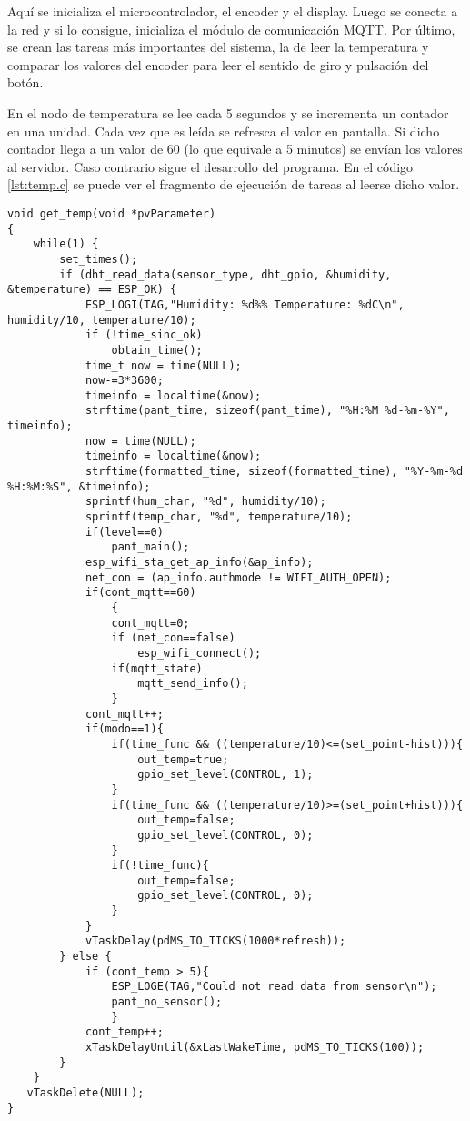Aquí se inicializa el microcontrolador, el encoder y el display. Luego se conecta a la red y si lo consigue, inicializa el módulo de comunicación MQTT. Por último, se crean las tareas más importantes del sistema, la de leer la temperatura y comparar los valores del encoder para leer el sentido de giro y pulsación del botón.

En el nodo de temperatura se lee cada 5 segundos y se incrementa un contador en una unidad. Cada vez que es leída se refresca el valor en pantalla. Si dicho contador llega a un valor de 60 (lo que equivale a 5 minutos) se envían los valores al servidor. Caso contrario sigue el desarrollo del programa. En el código \ref{lst:temp.c} se puede ver el fragmento de ejecución de tareas al leerse dicho valor.

\begin{lstlisting}[caption={Código de lectura de temperatura}, label={lst:temp.c}]
void get_temp(void *pvParameter)
{
    while(1) {
        set_times();
        if (dht_read_data(sensor_type, dht_gpio, &humidity, &temperature) == ESP_OK) {
            ESP_LOGI(TAG,"Humidity: %d%% Temperature: %dC\n", humidity/10, temperature/10);
            if (!time_sinc_ok)
                obtain_time();
            time_t now = time(NULL);
            now-=3*3600;
            timeinfo = localtime(&now);
            strftime(pant_time, sizeof(pant_time), "%H:%M %d-%m-%Y", timeinfo);
            now = time(NULL);
            timeinfo = localtime(&now);
            strftime(formatted_time, sizeof(formatted_time), "%Y-%m-%d %H:%M:%S", &timeinfo);
            sprintf(hum_char, "%d", humidity/10);
			sprintf(temp_char, "%d", temperature/10);
            if(level==0)
                pant_main();
            esp_wifi_sta_get_ap_info(&ap_info);
            net_con = (ap_info.authmode != WIFI_AUTH_OPEN);
            if(cont_mqtt==60)
                {
                cont_mqtt=0;
                if (net_con==false)
                    esp_wifi_connect();
                if(mqtt_state)    
                    mqtt_send_info();
                }
            cont_mqtt++;
            if(modo==1){
                if(time_func && ((temperature/10)<=(set_point-hist))){
                    out_temp=true;
                    gpio_set_level(CONTROL, 1);
                }
                if(time_func && ((temperature/10)>=(set_point+hist))){
                    out_temp=false;
                    gpio_set_level(CONTROL, 0);
                }
                if(!time_func){
                    out_temp=false;
                    gpio_set_level(CONTROL, 0);
                }
            }
            vTaskDelay(pdMS_TO_TICKS(1000*refresh));
        } else {
            if (cont_temp > 5){
                ESP_LOGE(TAG,"Could not read data from sensor\n");
			    pant_no_sensor();
                }
            cont_temp++;
            xTaskDelayUntil(&xLastWakeTime, pdMS_TO_TICKS(100));
        }
    }
   vTaskDelete(NULL);
}
\end{lstlisting}

